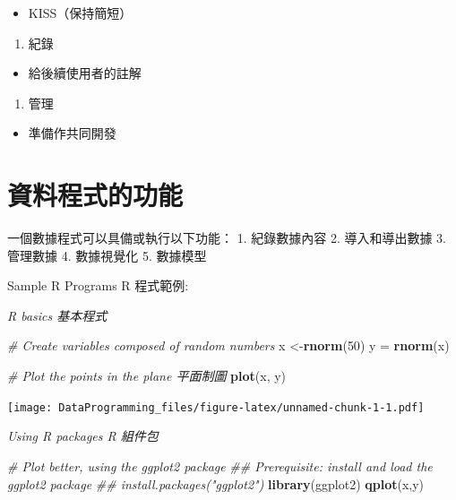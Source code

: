 \documentclass[]{book}
\newenvironment{Shaded}{\begin{snugshade}}{\end{snugshade}}
\newcommand{\CommentTok}[1]{\textcolor[rgb]{0.56,0.35,0.01}{\textit{#1}}}
\newcommand{\DecValTok}[1]{\textcolor[rgb]{0.00,0.00,0.81}{#1}}
\newcommand{\KeywordTok}[1]{\textcolor[rgb]{0.13,0.29,0.53}{\textbf{#1}}}
\newcommand{\NormalTok}[1]{#1}
\newcommand{\StringTok}[1]{\textcolor[rgb]{0.31,0.60,0.02}{#1}}
\providecommand{\tightlist}{%
  \setlength{\itemsep}{0pt}\setlength{\parskip}{0pt}}
\begin{document}
\begin{itemize}
\tightlist
\item
  KISS（保持簡短）
\end{itemize}

\begin{enumerate}
\def\labelenumi{\arabic{enumi}.}
\setcounter{enumi}{5}
\tightlist
\item
  紀錄
\end{enumerate}

\begin{itemize}
\tightlist
\item
  給後續使用者的註解
\end{itemize}

\begin{enumerate}
\def\labelenumi{\arabic{enumi}.}
\setcounter{enumi}{6}
\tightlist
\item
  管理
\end{enumerate}

\begin{itemize}
\tightlist
\item
  準備作共同開發
\end{itemize}

\hypertarget{section-2}{%
\section{資料程式的功能}\label{section-2}}

一個數據程式可以具備或執行以下功能：
1. 紀錄數據內容
2. 導入和導出數據
3. 管理數據
4. 數據視覺化
5. 數據模型

Sample R Programs R 程式範例:

\emph{R basics 基本程式}

\begin{Shaded}
\begin{Highlighting}[]
\CommentTok{# Create variables composed of random numbers}
\NormalTok{x <-}\KeywordTok{rnorm}\NormalTok{(}\DecValTok{50}\NormalTok{) }
\NormalTok{y =}\StringTok{ }\KeywordTok{rnorm}\NormalTok{(x)}

\CommentTok{# Plot the points in the plane 平面制圖 }
\KeywordTok{plot}\NormalTok{(x, y)}
\end{Highlighting}
\end{Shaded}

\texttt{[image: DataProgramming\_files/figure-latex/unnamed-chunk-1-1.pdf]}

\emph{Using R packages R 組件包}

\begin{Shaded}
\begin{Highlighting}[]
\CommentTok{# Plot better, using the ggplot2 package }
\CommentTok{## Prerequisite: install and load the ggplot2 package}
\CommentTok{## install.packages("ggplot2")}
\KeywordTok{library}\NormalTok{(ggplot2)}
\KeywordTok{qplot}\NormalTok{(x,y)}
\end{Highlighting}
\end{Shaded}
\end{document}
